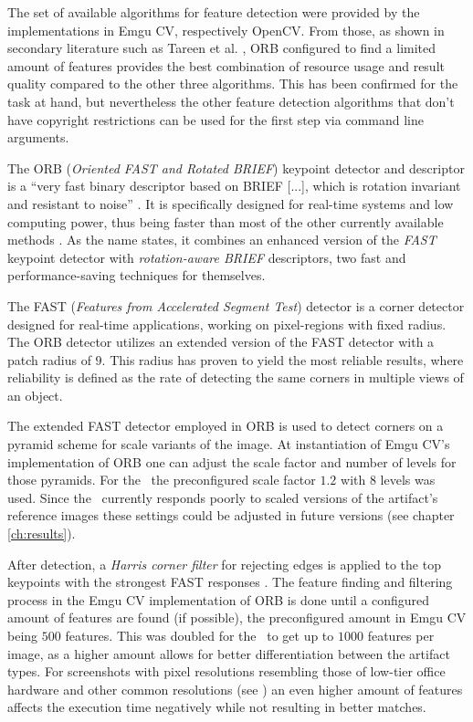The set of available algorithms for feature detection were provided by the implementations in Emgu CV, respectively OpenCV. From those, as shown in secondary literature such as Tareen et al. \cite{orb_comparison}, ORB configured to find a limited amount of features provides the best combination of resource usage and result quality compared to the other three algorithms. This has been confirmed for the task at hand, but nevertheless the other feature detection algorithms that don't have copyright restrictions can be used for the first step via command line arguments.

The ORB (\emph{Oriented FAST and Rotated BRIEF}) keypoint detector and descriptor is a ``very fast binary descriptor based on BRIEF [...], which is rotation invariant and resistant to noise'' \cite[p.~1]{orb}. It is specifically designed for real-time systems and low computing power, thus being faster than most of the other currently available methods \cite{orb, orb_comparison}. As the name states, it combines an enhanced version of the \emph{FAST}\cite{fast} keypoint detector with \emph{rotation-aware BRIEF}\cite{brief} descriptors, two fast and performance-saving techniques for themselves. \cite{orb, fast, brief}

The FAST (\emph{Features from Accelerated Segment Test}) detector \cite{fast} is a corner detector designed for real-time applications, working on pixel-regions with fixed radius. The ORB detector utilizes an extended version of the FAST detector with a patch radius of $9$. This radius has proven to yield the most reliable results, where reliability is defined as the rate of detecting the same corners in multiple views of an object. \cite{fast, orb}

The extended FAST detector employed in ORB is used to detect corners on a pyramid scheme for scale variants \cite{scale_pyramids} of the image. At instantiation of Emgu CV's implementation of ORB one can adjust the scale factor and number of levels for those pyramids. For the \vd~the preconfigured scale factor $1.2$ with $8$ levels was used. Since the \vd~currently responds poorly to scaled versions of the artifact's reference images these settings could be adjusted in future versions (see chapter \ref{ch:results}).

After detection, a \emph{Harris corner filter} \cite{harris_corner} for rejecting edges is applied to the top keypoints with the strongest FAST responses \cite{orb}. The feature finding and filtering process in the Emgu CV implementation of ORB is done until a configured amount of features are found (if possible), the preconfigured amount in Emgu CV being $500$ features. This was doubled for the \vd~to get up to $1000$ features per image, as a higher amount allows for better differentiation between the artifact types. For screenshots with pixel resolutions resembling those of low-tier office hardware and other common resolutions (see \cite{statctr}) an even higher amount of features affects the execution time negatively while not resulting in better matches.

